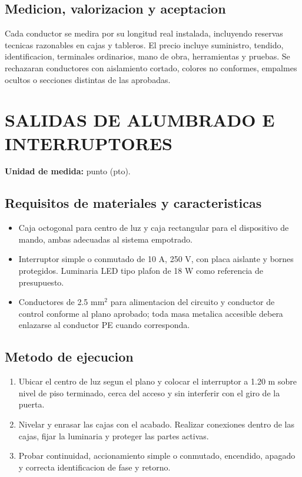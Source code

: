 \subsection{Medicion, valorizacion y aceptacion}
Cada conductor se medira por su longitud real instalada, incluyendo reservas tecnicas
razonables en cajas y tableros. El precio incluye suministro, tendido, identificacion,
terminales ordinarios, mano de obra, herramientas y pruebas. Se rechazaran conductores
con aislamiento cortado, colores no conformes, empalmes ocultos o secciones distintas
de las aprobadas.

\section{SALIDAS DE ALUMBRADO E INTERRUPTORES}

\textbf{Unidad de medida:} punto (pto).

\subsection{Requisitos de materiales y caracteristicas}
\begin{itemize}
  \item Caja octogonal para centro de luz y caja rectangular para el dispositivo de
  mando, ambas adecuadas al sistema empotrado.
  \item Interruptor simple o conmutado de 10 A, 250 V, con placa aislante y bornes
  protegidos. Luminaria LED tipo plafon de 18 W como referencia de presupuesto.
  \item Conductores de 2.5 mm\(^2\) para alimentacion del circuito y conductor de
  control conforme al plano aprobado; toda masa metalica accesible debera enlazarse al
  conductor PE cuando corresponda.
\end{itemize}

\subsection{Metodo de ejecucion}
\begin{enumerate}
  \item Ubicar el centro de luz segun el plano y colocar el interruptor a 1.20 m sobre
  nivel de piso terminado, cerca del acceso y sin interferir con el giro de la puerta.
  \item Nivelar y enrasar las cajas con el acabado. Realizar conexiones dentro de las
  cajas, fijar la luminaria y proteger las partes activas.
  \item Probar continuidad, accionamiento simple o conmutado, encendido, apagado y
  correcta identificacion de fase y retorno.
\end{enumerate}

